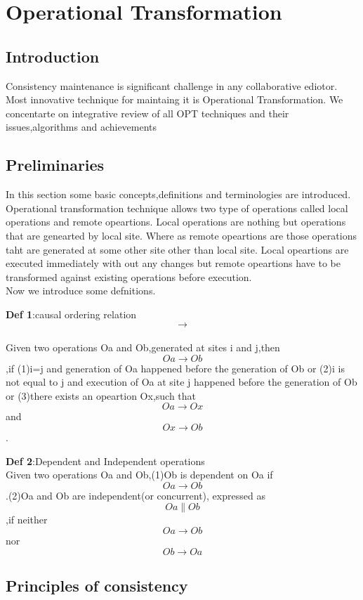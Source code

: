 
\section{Operational Transformation}

\subsection{Introduction} 
Consistency maintenance is significant challenge in any collaborative ediotor.
Most innovative technique for maintaing it is Operational Transformation.
We concentarte on integrative review of all OPT techniques and 
their issues,algorithms and achievements\cite{1998}

\subsection{Preliminaries}
In this section some basic concepts,definitions and terminologies are introduced.
Operational transformation technique allows two type of operations called local operations and remote opeartions.
Local operations are nothing but operations that are genearted by local site.
Where as remote opeartions are those operations taht are generated at some other site other than local site.
Local opeartions are executed immediately with out any changes but remote opeartions have to be transformed against existing operations before execution.  
\\Now we introduce some defnitions.

{\bf Def 1}:causal ordering relation \cite{1998}$$ \rightarrow $$
\\Given two operations Oa and Ob,generated at sites i and j,then $$Oa \rightarrow Ob$$,if (1)i=j and generation of Oa happened before
the generation of Ob or (2)i is not equal to j and execution of  Oa at site j happened before the generation of Ob or (3)there exists an
opeartion Ox,such that $$Oa \rightarrow Ox$$ and $$Ox \rightarrow Ob$$.

{\bf Def 2}:Dependent and Independent operations
\\Given two operations Oa and Ob,(1)Ob is dependent on Oa if $$Oa \rightarrow Ob$$.(2)Oa and Ob are independent(or concurrent),
expressed as $$Oa \parallel Ob$$,if neither $$Oa \rightarrow Ob$$ nor $$Ob \rightarrow Oa$$


\subsection{Principles of consistency}

